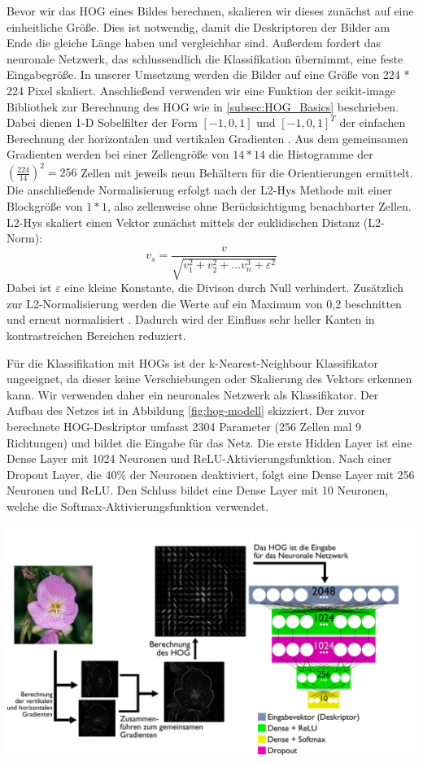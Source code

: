 \documentclass[11pt,a4paper]{article}
\begin{document}
Bevor wir das HOG eines Bildes berechnen, skalieren wir dieses zunächst auf eine einheitliche Größe. Dies ist notwendig, damit die Deskriptoren der Bilder am Ende die gleiche Länge haben und vergleichbar sind. Außerdem fordert das neuronale Netzwerk, das schlussendlich die Klassifikation übernimmt, eine feste Eingabegröße. In unserer Umsetzung werden die Bilder auf eine Größe von 224 * 224 Pixel skaliert. Anschließend verwenden wir eine Funktion der scikit-image Bibliothek zur Berechnung des HOG wie in \ref{subsec:HOG_Basics} beschrieben. Dabei dienen 1-D Sobelfilter der Form $[-1, 0, 1]$ und $[-1, 0, 1]^T$ der einfachen Berechnung der horizontalen und vertikalen Gradienten \cite{Dalal}\cite{sk_hog}. Aus dem gemeinsamen Gradienten werden bei einer Zellengröße von $14*14$ die Histogramme der $(\frac{224}{14})^2=256$ Zellen mit jeweils neun Behältern für die Orientierungen ermittelt. Die anschließende Normalisierung erfolgt nach der L2-Hys Methode mit einer Blockgröße von $1*1$, also zellenweise ohne Berücksichtigung benachbarter Zellen. L2-Hys skaliert einen Vektor zunächst mittels der euklidischen Distanz (L2-Norm):
$$v_s=\frac{v}{\sqrt{v_1^2 + v_2^2 + ... v_n^3 + \varepsilon^2}}$$
Dabei ist $\varepsilon$ eine kleine Konstante, die Divison durch Null verhindert. Zu\-sätz\-lich zur L2-Normalisierung werden die Werte auf ein Maximum von 0,2 beschnitten und erneut normalisiert \cite{wiki_hog}. Dadurch wird der Einfluss sehr heller Kanten in kontrastreichen Bereichen reduziert.

Für die Klassifikation mit HOGs ist der k-Nearest-Neighbour Klassifikator ungeeignet, da dieser keine Verschiebungen oder Skalierung des Vektors erkennen kann. Wir verwenden daher ein neuronales Netzwerk als Klassifikator. Der Aufbau des Netzes ist in Abbildung \ref{fig:hog-modell} skizziert. Der zuvor berechnete HOG-Deskriptor umfasst 2304 Parameter (256 Zellen mal 9 Richtungen) und bildet die Eingabe für das Netz. Die erste Hidden Layer ist eine Dense Layer mit 1024 Neuronen und ReLU-Aktivierungsfunktion. Nach einer Dropout Layer, die 40\% der Neuronen deaktiviert, folgt eine Dense Layer mit 256 Neuronen und ReLU. Den Schluss bildet eine Dense Layer mit 10 Neuronen, welche die Softmax-Aktivierungsfunktion verwendet.

\begin{minipage}{.92\linewidth}
	\includegraphics[width=\linewidth]{hog-modell.png}
	\label{fig:hog-modell}
\end{minipage}
\end{document}
